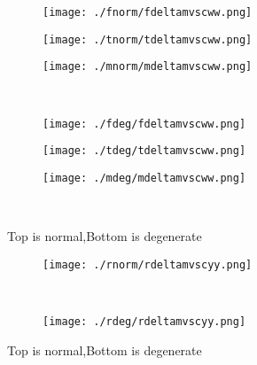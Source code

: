 \documentclass[aps,floats,floatfix,nofootinbib]{revtex4-1}
\begin{document}
\begin{center}
\begin{figure}
\begin{subfigure}{0.3\textwidth}
\texttt{[image: ./fnorm/fdeltamvscww.png]}
\label{}
\end{subfigure}
\begin{subfigure}{0.3\textwidth}
\texttt{[image: ./tnorm/tdeltamvscww.png]}
\label{}
\end{subfigure}
\begin{subfigure}{0.3\textwidth}
\texttt{[image: ./mnorm/mdeltamvscww.png]}
\label{}
\end{subfigure}\\
\begin{subfigure}{0.3\textwidth}
\texttt{[image: ./fdeg/fdeltamvscww.png]}
\label{}
\end{subfigure}
\begin{subfigure}{0.3\textwidth}
\texttt{[image: ./tdeg/tdeltamvscww.png]}
\label{}
\end{subfigure}
\begin{subfigure}{0.3\textwidth}
\texttt{[image: ./mdeg/mdeltamvscww.png]}
\label{}
\end{subfigure}\\
\caption{Top is normal,Bottom is degenerate}
\end{figure}
\end{center}

\begin{center}
\begin{figure}
\begin{subfigure}{1.0\textwidth}
\texttt{[image: ./rnorm/rdeltamvscyy.png]}
\label{}
\end{subfigure}\\
\begin{subfigure}{1.0\textwidth}
\texttt{[image: ./rdeg/rdeltamvscyy.png]}
\label{}
\end{subfigure}
\caption{Top is normal,Bottom is degenerate}
\end{figure}
\end{center}
\end{document}
